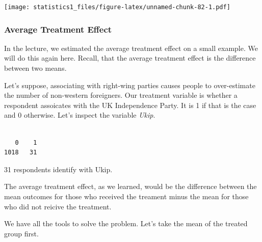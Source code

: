 \documentclass[]{article}
\newenvironment{Shaded}{\begin{snugshade}}{\end{snugshade}}
\newcommand{\KeywordTok}[1]{\textcolor[rgb]{0.13,0.29,0.53}{\textbf{#1}}}
\newcommand{\DataTypeTok}[1]{\textcolor[rgb]{0.13,0.29,0.53}{#1}}
\newcommand{\DecValTok}[1]{\textcolor[rgb]{0.00,0.00,0.81}{#1}}
\newcommand{\StringTok}[1]{\textcolor[rgb]{0.31,0.60,0.02}{#1}}
\newcommand{\OperatorTok}[1]{\textcolor[rgb]{0.81,0.36,0.00}{\textbf{#1}}}
\newcommand{\NormalTok}[1]{#1}
\theoremstyle{definition}
\theoremstyle{definition}
\theoremstyle{definition}
\theoremstyle{remark}
\begin{document}
\begin{Shaded}
\end{Shaded}

\texttt{[image: statistics1\_files/figure-latex/unnamed-chunk-82-1.pdf]}

\subsubsection{Average Treatment Effect}\label{average-treatment-effect}

In the lecture, we estimated the average treatment effect on a small
example. We will do this again here. Recall, that the average treatment
effect is the difference between two means.

Let's suppose, associating with right-wing parties causes people to
over-estimate the number of non-western foreigners. Our treatment
variable is whether a respondent assoicates with the UK Independence
Party. It is 1 if that is the case and 0 otherwise. Let's inspect the
variable \emph{Ukip}.

\begin{Shaded}
\end{Shaded}

\begin{verbatim}

   0    1 
1018   31 
\end{verbatim}

31 respondents identify with Ukip.

The average treatment effect, as we learned, would be the difference
between the mean outcomes for those who received the treament minus the
mean for those who did not reicive the treatment.

We have all the tools to solve the problem. Let's take the mean of the
treated group first.

\begin{Shaded}
\end{Shaded}
\end{document}
